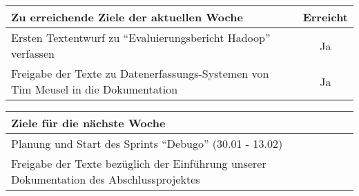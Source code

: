 \begin{tabularx}{\textwidth}{Xc}
    \arrayrulecolor{OliveGreen}
    \toprule
    {\bfseries Zu erreichende Ziele der aktuellen Woche} & {\bfseries Erreicht} \\
    \midrule[2pt]
    Ersten Textentwurf zu ``Evaluierungsbericht Hadoop'' verfassen  &  Ja  \\
    \rowcolor{OliveGreen!15}
    Freigabe der Texte zu Datenerfassungs-Systemen von Tim Meusel in die
    Dokumentation  &  Ja  \\
    \bottomrule[2pt]
\end{tabularx}
%
\vspace{1cm}
%
\begin{tabularx}{\textwidth}{Xc}
    \arrayrulecolor{OliveGreen}
    \toprule
    {\bfseries Ziele für die nächste Woche}              &                   \\
    \midrule[2pt]
    Planung und Start des Sprints ``Debugo'' (30.01 - 13.02)  &  \\
    \rowcolor{OliveGreen!15}
    Freigabe der Texte bezüglich der Einführung unserer Dokumentation des
    Abschlussprojektes  &  \\
\end{tabularx}
